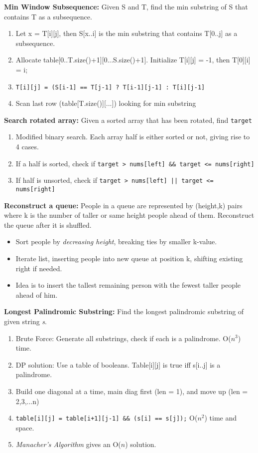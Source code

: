 \documentclass[12pt]{article}
\newcommand{\ON}{O($n$) }
\newcommand{\ONSQ}{O($n^2$) }
\newcommand{\ONCB}{O($n^3$) }
\begin{document}
\vspace{5mm}
\noindent
\textbf{Min Window Subsequence:}
Given S and T, find the min substring of S that contains T as a subsequence.
\begin{enumerate}
\item Let x =  T[i][j], then S[x..i] is the min substring that contains T[0..j] as a subsequence.
\item Allocate table[0..T.size()+1][0...S.size()+1]. Initialize T[i][j] = -1, then T[0][i] = i;
\item \texttt{T[i][j] = (S[i-1] == T[j-1] ? T[i-1][j-1] : T[i][j-1]}
\item Scan last row (table[T.size()][...]) looking for min substring
\end{enumerate}

\vspace{5mm}
\noindent
\textbf{Search rotated array:}
Given a sorted array that has been rotated, find \texttt{target} 
\begin{enumerate}
\item Modified binary search. Each array half is either sorted or not, giving rise to 4 cases.
\item If a half is sorted, check if \texttt{target > nums[left] \&\& target <= nums[right]}
\item If half is unsorted, check if \texttt{target > nums[left] || target <= nums[right]}
\end{enumerate}


\vspace{5mm}
\noindent
\textbf{Reconstruct a queue:} People in a queue are represented by (height,k) pairs where
k is the number of taller or same height people ahead of them. Reconstruct the
queue after it is shuffled.
\begin{itemize}
\item Sort people by \emph{decreasing height}, breaking ties by smaller k-value.
\item Iterate list, inserting people into new queue at position k, shifting existing right if needed.
\item Idea is to insert the tallest remaining person with the fewest taller people ahead of him.
\end{itemize}


\vspace{5mm}
\noindent
\textbf{Longest Palindromic Substring:}
Find the longest palindromic substring of given string \emph{s}.
\begin{enumerate}
\item Brute Force: Generate all substrings, check if each is a palindrome. \ONCB time.
\item DP solution: Use a table of booleans. Table[i][j] is true iff s[i..j] is a palindrome. 
\item Build one diagonal at a time, main diag first (len = 1), and move up (len = 2,3,...n)
\item \texttt{table[i][j] = table[i+1][j-1] \&\& (s[i] == s[j]);} \ONSQ time and space.
\item \emph{Manacher's Algorithm} gives an \ON solution.
\end{enumerate}
\end{document}

